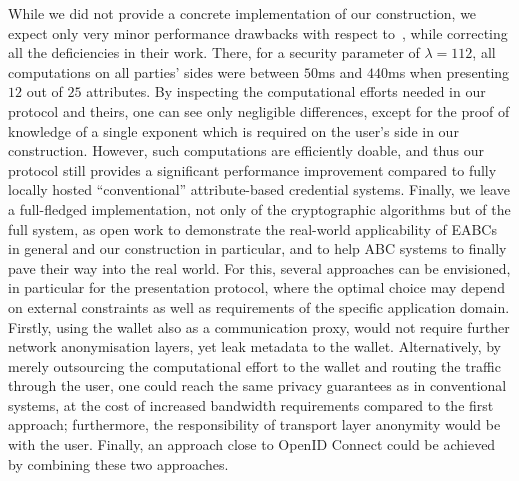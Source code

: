 \documentclass[runningheads]{llncs}
\begin{document}
 While we did not provide a concrete implementation of our construction, we expect only very minor performance drawbacks with respect to~\cite{towardsEABC}, while correcting all the deficiencies in their work. 
There, for a security parameter of $\lambda=112$, all computations on all parties' sides were between $50$ms and $440$ms when presenting $12$ out of $25$ attributes. 
By inspecting the computational efforts needed in our protocol and theirs, one can see only negligible differences, except for the proof of knowledge of a single exponent which is required on the user's side in our construction.
 However, such computations are efficiently doable, and thus our protocol still provides a significant performance improvement compared to fully locally hosted ``conventional'' attribute-based credential systems. 
Finally, we leave a full-fledged implementation, not only of the cryptographic algorithms but of the full system, as open work to demonstrate the real-world applicability of EABCs in general and our construction in particular, and to help ABC systems to finally pave their way into the real world.
For this, several approaches can be envisioned, in particular for the presentation protocol, where the optimal choice may depend on external constraints as well as requirements of the specific application domain.  
Firstly, using the wallet also as a communication proxy, would not require further network anonymisation layers, yet leak metadata to the wallet. 
Alternatively, by merely outsourcing the computational effort to the wallet and routing the traffic through the user, one could reach the same privacy guarantees as in conventional systems, at the cost of increased bandwidth requirements compared to the first approach;  furthermore, the responsibility of transport layer anonymity would be with the user.
Finally, an approach close to OpenID Connect could be achieved by combining these two approaches.
  

\end{document}
